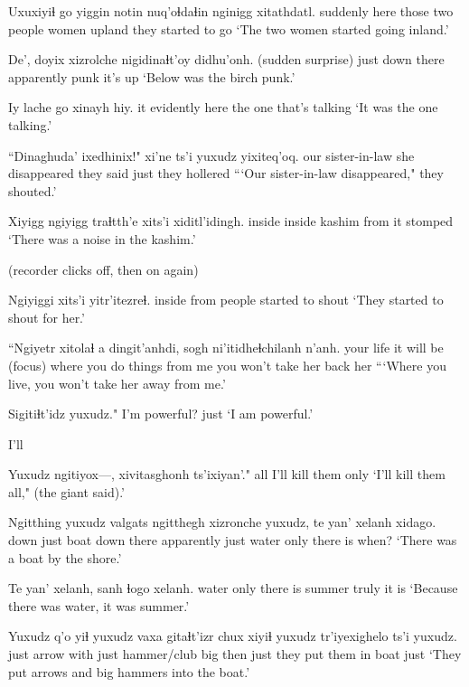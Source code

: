 \documentclass[12pt]{article}
\begin{document}
\gll Uxuxiyiɬ go yiggin notin nuq'oɬdaɬin nginigg xitathdatl.
suddenly here those {two people} women upland {they started to go}
\glt `The two women started going inland.'
\glend

\gll De', doyix xizrolche nigidinaɬt'oy didhu'onh.
{(sudden surprise)} {just down there} apparently punk {it's up}
\glt `Below was the birch punk.'
\glend

\gll Iy lache go {xinayh hiy.}
it evidently here {the one that's talking}
\glt `It was the one talking.'
\glend

\gll ``Dinaghuda' ixedhinix!" xi'ne ts'i yuxudz yixiteq'oq.
{our sister-in-law} {she disappeared} {they said} {} just {they hollered}
\glt ```Our sister-in-law disappeared," they shouted.'
\glend

\gll Xiyigg ngiyigg traɬtth'e xits'i xiditl'idingh.
inside inside kashim from {it stomped}
\glt `There was a noise in the kashim.'
\glend

(recorder clicks off, then on again)

\gll Ngiyiggi xits'i yitr'itezreɬ.
inside from {people started to shout}
\glt `They started to shout for her.'
\glend

\gll ``Ngiyetr xitolaɬ a dingit'anhdi, sogh ni'itidheɬchilanh n'anh.
{your life} {it will be} {(focus)} {where you do things} {from me} {you won't take her back} her
\glt ```Where you live, you won't take her away from me.'
\glend

\gll Sigitiɬt'idz yuxudz."
{{I'm powerful?}} just
\glt `I am powerful.'
\glend

I'll

\gll  Yuxudz ngitiyox---,  xivitasghonh ts'ixiyan'."
all {} {I'll kill them} only
\glt `I'll kill them all," (the giant said).'
\glend

\gll Ngitthing yuxudz valgats ngitthegh xizronche yuxudz, te yan' xelanh xidago. 
down just boat {down there} apparently just  water only {there is} {when?} 
\glt `There was a boat by the shore.'
\glend

\gll Te yan' xelanh, sanh ɬogo xelanh.
water only {there is} summer truly {it is}
\glt `Because there was water, it was summer.'
\glend

\gll Yuxudz q'o yiɬ yuxudz {vaxa gitaɬt'izr} chux xiyiɬ yuxudz tr'iyexighelo ts'i yuxudz.
just arrow with just hammer/club big then just {they put them in boat} {} just
\glt `They put arrows and big hammers into the boat.'
\glend
\end{document}
